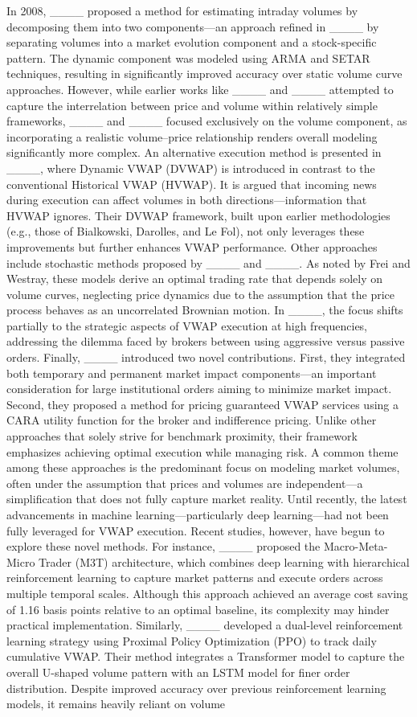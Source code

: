 In 2008, ____ proposed a method for estimating intraday volumes by decomposing them into two components—an approach refined in ____ by separating volumes into a market evolution component and a stock-specific pattern. The dynamic component was modeled using ARMA and SETAR techniques, resulting in significantly improved accuracy over static volume curve approaches. However, while earlier works like ____ and ____ attempted to capture the interrelation between price and volume within relatively simple frameworks, ____ and ____ focused exclusively on the volume component, as incorporating a realistic volume–price relationship renders overall modeling significantly more complex. An alternative execution method is presented in ____, where Dynamic VWAP (DVWAP) is introduced in contrast to the conventional Historical VWAP (HVWAP). It is argued that incoming news during execution can affect volumes in both directions—information that HVWAP ignores. Their DVWAP framework, built upon earlier methodologies (e.g., those of Bialkowski, Darolles, and Le Fol), not only leverages these improvements but further enhances VWAP performance. Other approaches include stochastic methods proposed by ____ and ____. As noted by Frei and Westray, these models derive an optimal trading rate that depends solely on volume curves, neglecting price dynamics due to the assumption that the price process behaves as an uncorrelated Brownian motion. In ____, the focus shifts partially to the strategic aspects of VWAP execution at high frequencies, addressing the dilemma faced by brokers between using aggressive versus passive orders. Finally, ____ introduced two novel contributions. First, they integrated both temporary and permanent market impact components—an important consideration for large institutional orders aiming to minimize market impact. Second, they proposed a method for pricing guaranteed VWAP services using a CARA utility function for the broker and indifference pricing. Unlike other approaches that solely strive for benchmark proximity, their framework emphasizes achieving optimal execution while managing risk. A common theme among these approaches is the predominant focus on modeling market volumes, often under the assumption that prices and volumes are independent—a simplification that does not fully capture market reality. Until recently, the latest advancements in machine learning—particularly deep learning—had not been fully leveraged for VWAP execution. Recent studies, however, have begun to explore these novel methods. For instance, ____ proposed the Macro-Meta-Micro Trader (M3T) architecture, which combines deep learning with hierarchical reinforcement learning to capture market patterns and execute orders across multiple temporal scales. Although this approach achieved an average cost saving of 1.16 basis points relative to an optimal baseline, its complexity may hinder practical implementation. Similarly, ____ developed a dual-level reinforcement learning strategy using Proximal Policy Optimization (PPO) to track daily cumulative VWAP. Their method integrates a Transformer model to capture the overall U-shaped volume pattern with an LSTM model for finer order distribution. Despite improved accuracy over previous reinforcement learning models, it remains heavily reliant on volume 